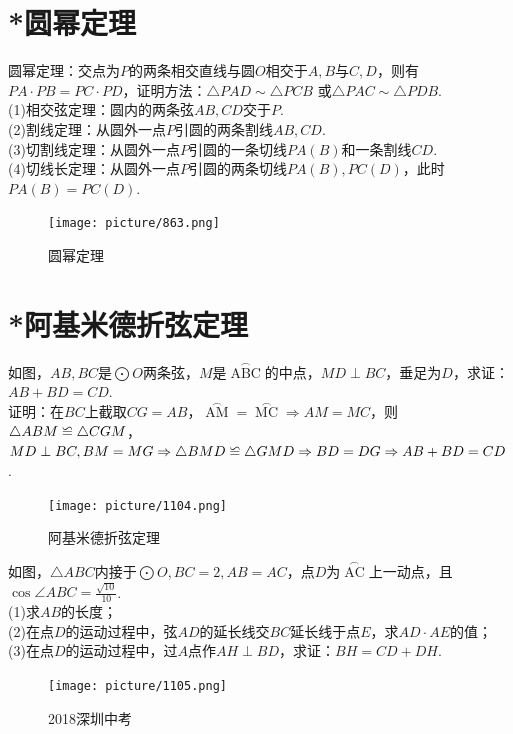 \documentclass{ecnuthesis}
\newcommand\backcong{\mathrel{\reflectbox{$\cong$}}}
\begin{document}
\section{*圆幂定理}
\begin{knowledge}
    圆幂定理：交点为$P$的两条相交直线与圆$O$相交于$A,B$与$C,D$，则有$PA·PB=PC·PD$，证明方法：$\triangle PAD \sim \triangle PCB$
    或$\triangle PAC \sim \triangle PDB$. \\
    (1)相交弦定理：圆内的两条弦$AB,CD$交于$P$.\\
    (2)割线定理：从圆外一点$P$引圆的两条割线$AB,CD$.\\
    (3)切割线定理：从圆外一点$P$引圆的一条切线$PA(B)$和一条割线$CD$. \\
    (4)切线长定理：从圆外一点$P$引圆的两条切线$PA(B),PC(D)$，此时$PA(B)=PC(D)$.
\end{knowledge}
\begin{figure}[H]
\centering
\texttt{[image: picture/863.png]}
\caption{圆幂定理}
\end{figure}
\clearpage
\section{*阿基米德折弦定理}
\begin{model}
    如图，$AB,BC$是$\bigodot O$两条弦，$M$是$\mathop{ABC}\limits^{\frown}$的中点，$MD\perp BC$，垂足为$D$，求证：$AB+BD=CD$. \\
    证明：在$BC$上截取$CG=AB$，$\mathop{AM}\limits^{\frown}=\mathop{MC}\limits^{\frown} \Rightarrow AM=MC$，则$\triangle ABM \backcong \triangle CGM$，
    $MD\perp BC,BM=MG \Rightarrow \triangle BMD \backcong \triangle GMD \Rightarrow BD=DG \Rightarrow AB+BD=CD$.
\end{model}
\begin{figure}[H]
\centering
\texttt{[image: picture/1104.png]}
\caption{阿基米德折弦定理}
\end{figure}
\begin{problem}
    如图，$\triangle ABC$内接于$\bigodot O,BC=2,AB=AC$，点$D$为$\mathop{AC}\limits^{\frown}$上一动点，且$\cos \angle ABC=\frac{\sqrt{10}}{10}$. \\
    (1)求$AB$的长度；\\
    (2)在点$D$的运动过程中，弦$AD$的延长线交$BC$延长线于点$E$，求$AD·AE$的值；\\
    (3)在点$D$的运动过程中，过$A$点作$AH\perp BD$，求证：$BH=CD+DH$.
\end{problem}
\begin{figure}[H]
\centering
\texttt{[image: picture/1105.png]}
\caption{2018深圳中考}
\end{figure}
\clearpage
\end{document}
